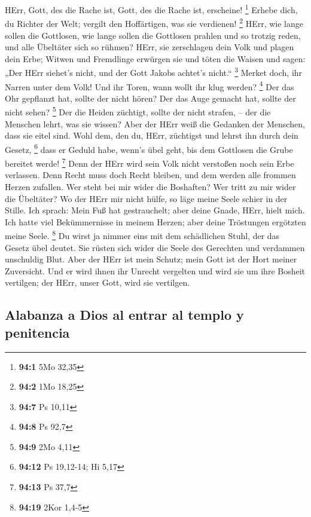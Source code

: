 HErr, Gott, des die Rache ist, Gott, des die Rache ist,
erscheine! \footnote{\textbf{94:1} 5Mo 32,35}  Erhebe
dich, du Richter der Welt; vergilt den Hoffärtigen, was sie verdienen!
\footnote{\textbf{94:2} 1Mo 18,25}  HErr, wie lange sollen
die Gottlosen, wie lange sollen die Gottlosen prahlen  und
so trotzig reden, und alle Übeltäter sich so rühmen? 
HErr, sie zerschlagen dein Volk und plagen dein Erbe; 
Witwen und Fremdlinge erwürgen sie und töten die Waisen 
und sagen: „Der HErr siehet's nicht, und der Gott Jakobs achtet's
nicht.`` \footnote{\textbf{94:7} Ps 10,11}  Merket doch,
ihr Narren unter dem Volk! Und ihr Toren, wann wollt ihr klug werden?
\footnote{\textbf{94:8} Ps 92,7}  Der das Ohr gepflanzt
hat, sollte der nicht hören? Der das Auge gemacht hat, sollte der nicht
sehen? \footnote{\textbf{94:9} 2Mo 4,11}  Der die Heiden
züchtigt, sollte der nicht strafen, -- der die Menschen lehrt, was sie
wissen?  Aber der HErr weiß die Gedanken der Menschen,
dass sie eitel sind.  Wohl dem, den du, HErr, züchtigst
und lehrst ihn durch dein Gesetz, \footnote{\textbf{94:12} Ps 19,12-14;
  Hi 5,17}  dass er Geduld habe, wenn's übel geht, bis
dem Gottlosen die Grube bereitet werde! \footnote{\textbf{94:13} Ps 37,7}
 Denn der HErr wird sein Volk nicht verstoßen noch sein
Erbe verlassen.  Denn Recht muss doch Recht bleiben, und
dem werden alle frommen Herzen zufallen.  Wer steht bei
mir wider die Boshaften? Wer tritt zu mir wider die Übeltäter?
 Wo der HErr mir nicht hülfe, so läge meine Seele schier
in der Stille.  Ich sprach: Mein Fuß hat gestrauchelt;
aber deine Gnade, HErr, hielt mich.  Ich hatte viel
Bekümmernisse in meinem Herzen; aber deine Tröstungen ergötzten meine
Seele. \footnote{\textbf{94:19} 2Kor 1,4-5}  Du wirst ja
nimmer eins mit dem schädlichen Stuhl, der das Gesetz übel deutet.
 Sie rüsten sich wider die Seele des Gerechten und
verdammen unschuldig Blut.  Aber der HErr ist mein
Schutz; mein Gott ist der Hort meiner Zuversicht.  Und er
wird ihnen ihr Unrecht vergelten und wird sie um ihre Bosheit vertilgen;
der HErr, unser Gott, wird sie vertilgen.

\hypertarget{alabanza-a-dios-al-entrar-al-templo-y-penitencia}{%
\subsection{Alabanza a Dios al entrar al templo y
penitencia}\label{alabanza-a-dios-al-entrar-al-templo-y-penitencia}}

